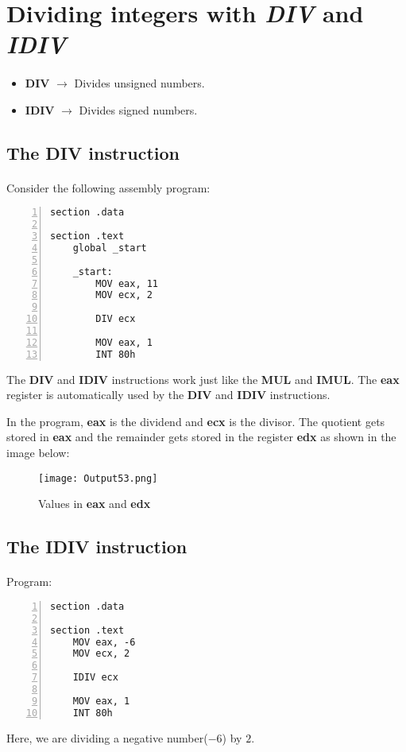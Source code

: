 \documentclass{article}
\begin{document}
\section{Dividing integers with \textit{DIV} and \textit{IDIV}}\label{sec:sec1}
\paragraph{}
\begin{itemize}
\item \textbf{DIV} $\rightarrow$ Divides unsigned numbers.
\item \textbf{IDIV} $\rightarrow$ Divides signed numbers.
\end{itemize}

\subsection{The DIV instruction}\label{sec:subsec1}
\paragraph{}
Consider the following assembly program:
\begin{Verbatim}[numbers=left, frame=single]
section .data

section .text
	global _start
	
	_start:
		MOV eax, 11
		MOV ecx, 2
		
		DIV ecx
		
		MOV eax, 1
		INT 80h
\end{Verbatim}
The \textbf{DIV} and \textbf{IDIV} instructions work just like the \textbf{MUL} and \textbf{IMUL}.
The \textbf{eax} register is automatically used by the \textbf{DIV} and \textbf{IDIV} instructions.

In the program, \textbf{eax} is the dividend and \textbf{ecx} is the divisor. The quotient gets stored in \textbf{eax} and the remainder gets stored in the register \textbf{edx} as shown in the image below:

\begin{figure}[h]
\centering
\texttt{[image: Output53.png]}
\caption{Values in \textbf{eax} and \textbf{edx}}
\label{fig:fig1}
\end{figure}
\newpage
\subsection{The IDIV instruction}\label{sec:subsec2}
\paragraph{}
Program:
\begin{Verbatim}[numbers=left, frame=single]
section .data

section .text
	MOV eax, -6
	MOV ecx, 2
	
	IDIV ecx
	
	MOV eax, 1
	INT 80h
\end{Verbatim}
Here, we are dividing a negative number($-6$) by $2$.
\end{document}
